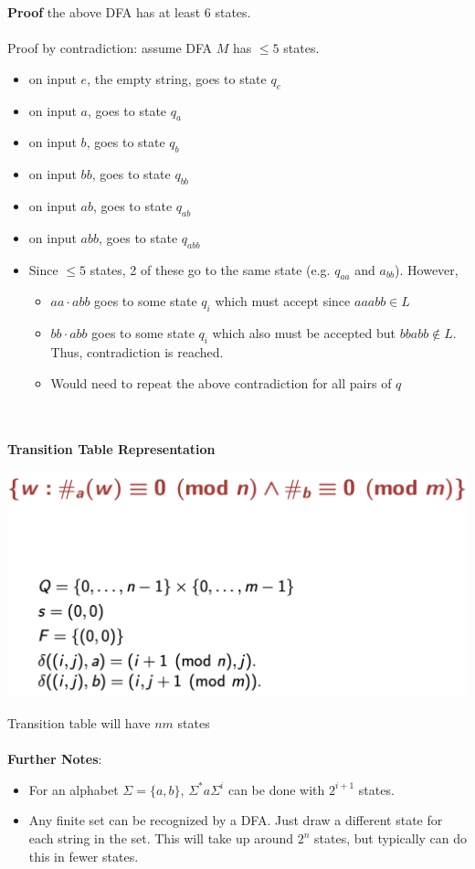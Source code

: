 \documentclass{article}
\begin{document}
  \textbf{Proof} the above DFA has at least 6 states. \\ \\
  Proof by contradiction: assume DFA $M$ has $\leq 5$ states.
  \begin{itemize}
    \item on input $e$, the empty string, goes to state $q_e$
    \item on input $a$, goes to state $q_a$
    \item on input $b$, goes to state $q_b$
    \item on input $bb$, goes to state $q_{bb}$
    \item on input $ab$, goes to state $q_{ab}$
    \item on input $abb$, goes to state $q_{abb}$
    \item Since $\leq 5$ states, 2 of these go to the same state (e.g. $q_{aa}$ and $a_{bb}$). However,
      \begin{itemize}
        \item $aa \cdot abb$ goes to some state $q_i$ which must accept since $aaabb \in L$
        \item $bb \cdot abb$ goes to some state $q_i$ which also must be accepted but $bbabb \notin L$. Thus, contradiction is reached.
        \item Would need to repeat the above contradiction for all pairs of $q$
      \end{itemize}
  \end{itemize} \\ \\
  \textbf{Transition Table Representation}
  \begin{center}
    \includegraphics[scale=0.5]{TransitionTable}
  \end{center}
  Transition table will have $nm$ states \\ \\
  \textbf{Further Notes}: 
  \begin{itemize}
    \item For an alphabet $\Sigma = \{a, b\}$, $\Sigma^* a \Sigma^i$ can be done with $2^{i+1}$ states.
    \item Any finite set can be recognized by a DFA. Just draw a different state for each string in the set. This will take up around $2^n$ states, but typically can do this in fewer states. \\ \\
  \end{itemize}
\end{document}

